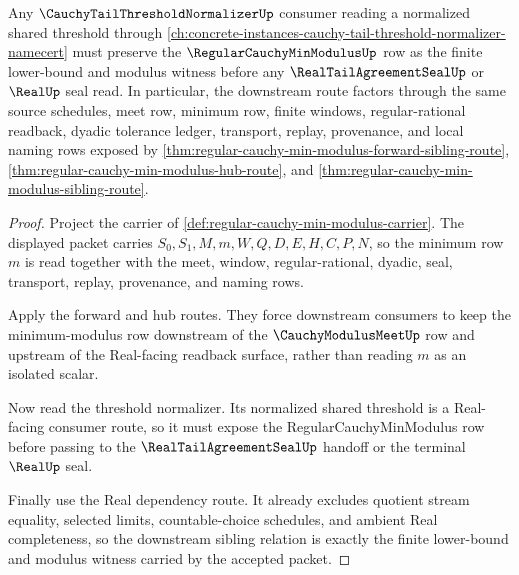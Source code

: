 \begin{theorem}
\label{thm:regular-cauchy-min-modulus-downstream-sibling-route}
Any $\CauchyTailThresholdNormalizerUp$ consumer reading a normalized shared threshold through \autoref{ch:concrete-instances-cauchy-tail-threshold-normalizer-namecert} must preserve the $\RegularCauchyMinModulusUp$ row as the finite lower-bound and modulus witness before any $\RealTailAgreementSealUp$ or $\RealUp$ seal read. In particular, the downstream route factors through the same source schedules, meet row, minimum row, finite windows, regular-rational readback, dyadic tolerance ledger, transport, replay, provenance, and local naming rows exposed by \autoref{thm:regular-cauchy-min-modulus-forward-sibling-route}, \autoref{thm:regular-cauchy-min-modulus-hub-route}, and \autoref{thm:regular-cauchy-min-modulus-sibling-route}.
\end{theorem}
\begin{proof}
Project the carrier of \autoref{def:regular-cauchy-min-modulus-carrier}. The displayed packet carries $S_0,S_1,M,m,W,Q,D,E,H,C,P,N$, so the minimum row $m$ is read together with the meet, window, regular-rational, dyadic, seal, transport, replay, provenance, and naming rows.

Apply the forward and hub routes. They force downstream consumers to keep the minimum-modulus row downstream of the $\CauchyModulusMeetUp$ row and upstream of the Real-facing readback surface, rather than reading $m$ as an isolated scalar.

Now read the threshold normalizer. Its normalized shared threshold is a Real-facing consumer route, so it must expose the RegularCauchyMinModulus row before passing to the $\RealTailAgreementSealUp$ handoff or the terminal $\RealUp$ seal.

Finally use the Real dependency route. It already excludes quotient stream equality, selected limits, countable-choice schedules, and ambient Real completeness, so the downstream sibling relation is exactly the finite lower-bound and modulus witness carried by the accepted packet.
\end{proof}
